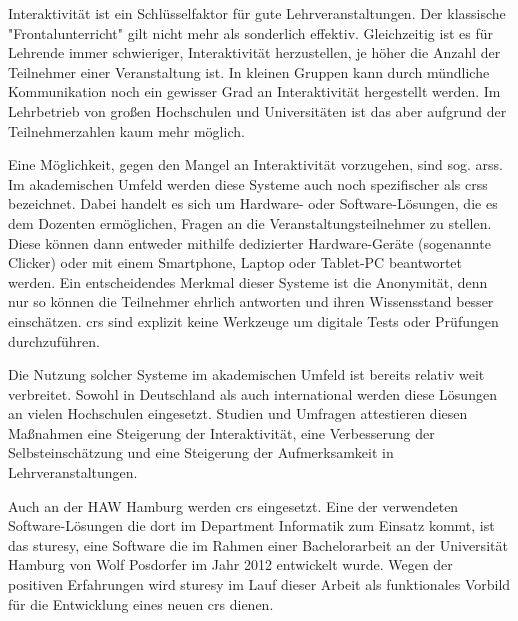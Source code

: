 Interaktivität ist ein Schlüsselfaktor für gute Lehrveranstaltungen. Der klassische "Frontalunterricht" gilt nicht mehr als sonderlich effektiv. Gleichzeitig ist es für Lehrende immer schwieriger, Interaktivität herzustellen, je höher die Anzahl der Teilnehmer einer Veranstaltung ist. In kleinen Gruppen kann durch mündliche Kommunikation noch ein gewisser Grad an Interaktivität hergestellt werden. Im Lehrbetrieb von großen Hochschulen und Universitäten ist das aber aufgrund der Teilnehmerzahlen kaum mehr möglich.

Eine Möglichkeit, gegen den Mangel an Interaktivität vorzugehen, sind sog. \acp{ars}. Im akademischen Umfeld werden diese Systeme auch noch spezifischer als \acp{crs} bezeichnet. Dabei handelt es sich um Hardware- oder Software-Lösungen, die es dem Dozenten ermöglichen, Fragen an die Veranstaltungsteilnehmer zu stellen. Diese können dann entweder mithilfe dedizierter Hardware-Geräte (sogenannte Clicker) oder mit einem Smartphone, Laptop oder Tablet-PC beantwortet werden. Ein entscheidendes Merkmal dieser Systeme ist die Anonymität, denn nur so können die Teilnehmer ehrlich antworten und ihren Wissensstand besser einschätzen. \ac{crs} sind explizit keine Werkzeuge um digitale Tests oder Prüfungen  durchzuführen.

Die Nutzung solcher Systeme im akademischen Umfeld ist bereits relativ weit verbreitet. Sowohl in Deutschland als auch international werden diese Lösungen an vielen Hochschulen eingesetzt. Studien und Umfragen attestieren diesen Maßnahmen eine Steigerung der Interaktivität, eine Verbesserung der Selbsteinschätzung und eine Steigerung der Aufmerksamkeit in Lehrveranstaltungen.\cite{web:wisconsin, web:tenyears}

Auch an der HAW Hamburg werden \ac{crs} eingesetzt. Eine der verwendeten Software-Lösungen die dort im Department Informatik zum Einsatz kommt, ist das \ac{sturesy}, eine Software die im Rahmen einer Bachelorarbeit an der Universität Hamburg von Wolf Posdorfer im Jahr 2012 entwickelt wurde\cite{sturesy}. Wegen der positiven Erfahrungen wird \ac{sturesy}  im Lauf dieser Arbeit als funktionales Vorbild für die Entwicklung eines neuen \ac{crs} dienen.
